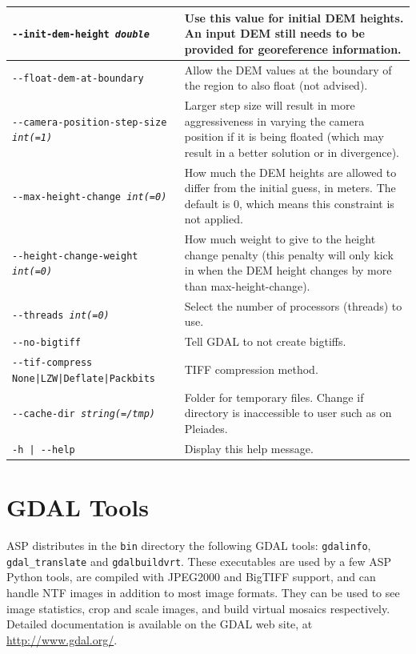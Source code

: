\begin{longtable}{|l|p{7.5cm}|}
\texttt{-\/-init-dem-height \textit{double}} & Use this value for initial DEM heights. An input DEM still needs to be provided for georeference information.\\ \hline
\texttt{-\/-float-dem-at-boundary} & Allow the DEM values at the boundary of the region to also float (not advised).\\ \hline
\texttt{-\/-camera-position-step-size \textit{int(=1)}} & Larger step size will result in more aggressiveness in varying the camera position if it is being floated (which may result in a better solution or in divergence).\\ \hline
\texttt{-\/-max-height-change \textit{int(=0)}} & How much the DEM heights are allowed to differ from the initial guess, in meters. The default is 0, which means this constraint is not applied.\\ \hline
\texttt{-\/-height-change-weight \textit{int(=0)}} & How much weight to give to the height change penalty (this penalty will only kick in when the DEM height changes by more than max-height-change).\\ \hline
\texttt{-\/-threads \textit{int(=0)}} & Select the number of processors (threads) to use.\\ \hline
\texttt{-\/-no-bigtiff} & Tell GDAL to not create bigtiffs.\\ \hline
\texttt{-\/-tif-compress None|LZW|Deflate|Packbits} & TIFF compression method.\\ \hline
\texttt{-\/-cache-dir \textit{string(=/tmp)}} & Folder for temporary files. Change if directory is inaccessible to user such as on Pleiades.\\ \hline
\texttt{-h | -\/-help } & Display this help message.\\ \hline
\end{longtable}


\section{GDAL Tools}

ASP distributes in the \texttt{bin} directory the following GDAL tools:
\texttt{gdalinfo}, \texttt{gdal\_translate} and \texttt{gdalbuildvrt}.
These executables are used by a few ASP Python tools, are compiled with
JPEG2000 and BigTIFF support, and can handle NTF images in addition to
most image formats.  They can be used to see image statistics, crop and
scale images, and build virtual mosaics respectively. Detailed
documentation is available on the GDAL web site, at
\url{http://www.gdal.org/}.
